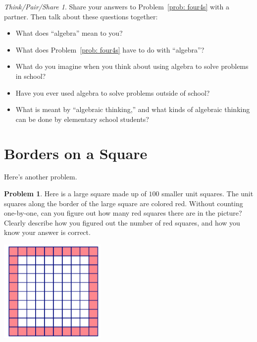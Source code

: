 \documentclass[12pt, reqno]{amsart}
\theoremstyle{remark}
\newtheorem*{thinkpair*}{Think/Pair/Share}
\theoremstyle{definition}
\newtheorem{problem}{Problem}
\numberwithin{equation}{section}  %
\begin{document}
\bigskip
\bigskip

\begin{thinkpair*}
Share your answers to Problem~\ref{prob: four4s} with a partner.  Then talk about these questions together:
\begin{itemize}
\item
What does ``algebra'' mean to you?  \\
\item
What does Problem~\ref{prob: four4s}  have to do with ``algebra''?\\
\item
What do you imagine when you think about using algebra to solve problems in school?  \\
\item
Have you ever used algebra to solve problems outside of school?\\
\item
What is meant by ``algebraic thinking,'' and what kinds of algebraic thinking can be done by elementary school students?
\end{itemize}
\end{thinkpair*} 

\newpage



\section{Borders on a Square}
Here's another problem.


\begin{problem}\label{prob: border}
Here is a large square made up of $100$ smaller unit squares.  The unit squares along the border of the large square are colored red.  Without counting one-by-one, can you figure out how many red squares there are in the picture?
Clearly describe how you figured out the number of red squares, and how you know your answer is correct.

\bigskip
\bigskip


\begin{center}
\includegraphics[height=5cm]{border1}
\end{center}
\end{problem}
\end{document}
